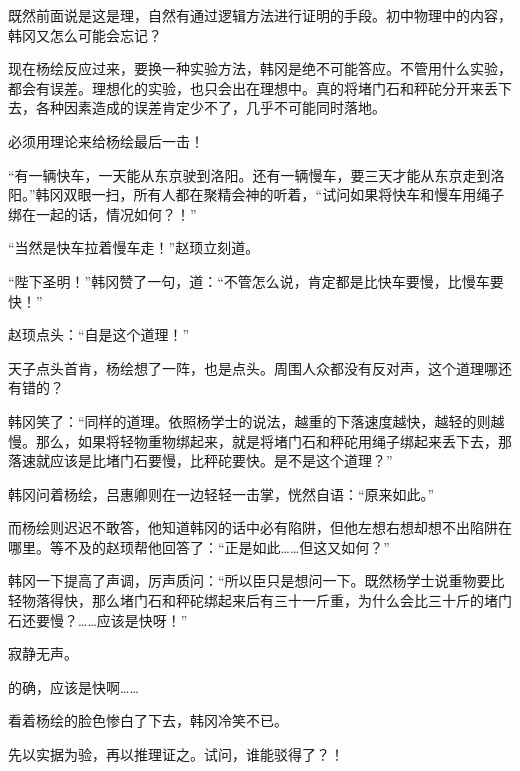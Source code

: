 既然前面说是这是理，自然有通过逻辑方法进行证明的手段。初中物理中的内容，韩冈又怎么可能会忘记？

现在杨绘反应过来，要换一种实验方法，韩冈是绝不可能答应。不管用什么实验，都会有误差。理想化的实验，也只会出在理想中。真的将堵门石和秤砣分开来丢下去，各种因素造成的误差肯定少不了，几乎不可能同时落地。

必须用理论来给杨绘最后一击！

“有一辆快车，一天能从东京驶到洛阳。还有一辆慢车，要三天才能从东京走到洛阳。”韩冈双眼一扫，所有人都在聚精会神的听着，“试问如果将快车和慢车用绳子绑在一起的话，情况如何？！”

“当然是快车拉着慢车走！”赵顼立刻道。

“陛下圣明！”韩冈赞了一句，道：“不管怎么说，肯定都是比快车要慢，比慢车要快！”

赵顼点头：“自是这个道理！”

天子点头首肯，杨绘想了一阵，也是点头。周围人众都没有反对声，这个道理哪还有错的？

韩冈笑了：“同样的道理。依照杨学士的说法，越重的下落速度越快，越轻的则越慢。那么，如果将轻物重物绑起来，就是将堵门石和秤砣用绳子绑起来丢下去，那落速就应该是比堵门石要慢，比秤砣要快。是不是这个道理？”

韩冈问着杨绘，吕惠卿则在一边轻轻一击掌，恍然自语：“原来如此。”

而杨绘则迟迟不敢答，他知道韩冈的话中必有陷阱，但他左想右想却想不出陷阱在哪里。等不及的赵顼帮他回答了：“正是如此……但这又如何？”

韩冈一下提高了声调，厉声质问：“所以臣只是想问一下。既然杨学士说重物要比轻物落得快，那么堵门石和秤砣绑起来后有三十一斤重，为什么会比三十斤的堵门石还要慢？……应该是快呀！”

寂静无声。

的确，应该是快啊……

看着杨绘的脸色惨白了下去，韩冈冷笑不已。

先以实据为验，再以推理证之。试问，谁能驳得了？！

